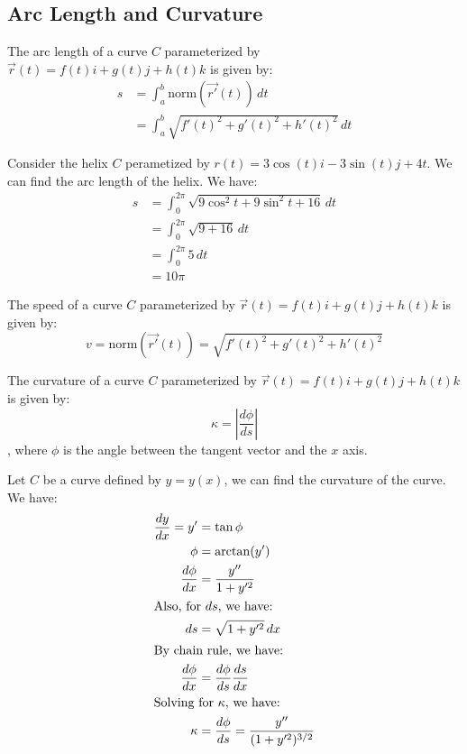 \documentclass[11pt]{article}
\begin{document}
\subsection{Arc Length and Curvature}
\begin{definition}
    The arc length of a curve $C$ parameterized by $\vec{r}(t) = f(t)i + g(t)j + h(t)k$ is given by:
    \begin{align}
        s &= \int_a^b \text{norm}(\vec{r'}(t)) \, dt \\
        &= \int_a^b \sqrt{f'(t)^2 + g'(t)^2 + h'(t)^2} \, dt
    \end{align}
\end{definition}
\begin{example}[Helix]
    Consider the helix $C$ perametized by $r(t) = 3\cos(t)i - 3\sin(t)j + 4t$. We can find the arc length of the helix. We have:
    \begin{align*}
        s &= \int_0^{2\pi} \sqrt{9\cos ^2 t + 9\sin ^2 t + 16} \, dt \\
        &= \int_0^{2\pi} \sqrt{9 + 16} \, dt \\
        &= \int_0^{2\pi} 5 \, dt \\
        &= 10\pi
    \end{align*}
\end{example}
\begin{definition}[Speed]
    The speed of a curve $C$ parameterized by $\vec{r}(t) = f(t)i + g(t)j + h(t)k$ is given by:
    \begin{equation}
        v = \text{norm}(\vec{r'}(t)) = \sqrt{f'(t)^2 + g'(t)^2 + h'(t)^2}
    \end{equation}
\end{definition}
\begin{definition}[Curvature]
    The curvature of a curve $C$ parameterized by $\vec{r}(t) = f(t)i + g(t)j + h(t)k$ is given by:
    \begin{equation}
        \kappa = \left| \frac{d\phi}{ds} \right|
    \end{equation}
    , where $\phi$ is the angle between the tangent vector and the $x$ axis.
\end{definition}
\begin{example}
    Let $C$ be a curve defined by $y = y(x)$, we can find the curvature of the curve. We have:
    \begin{align*}
        \frac{dy}{dx} = y' &= \tan \phi \\
        \phi &= \arctan(y') \\
        \frac{d\phi}{dx} &= \frac{y''}{1 + y'^2} \\
        \intertext{Also, for $ds$, we have:}
        ds &= \sqrt{1 + y'^2} \, dx \\
        \intertext{By chain rule, we have:}
        \frac{d\phi}{dx} &= \frac{d\phi}{ds} \frac{ds}{dx} \\
        \intertext{Solving for $\kappa$, we have:}
        \kappa &= \frac{d\phi}{ds} = \frac{y''}{(1 + y'^2)^{3/2}}
    \end{align*}
\end{example}
\end{document}
